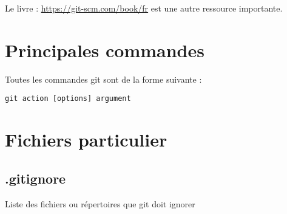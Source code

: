 \documentclass[a4paper]{article}
\begin{document}
Le livre : \url{https://git-scm.com/book/fr} est une autre ressource importante.

\section*{Principales commandes}

Toutes les commandes git sont de la forme suivante : 
\begin{verbatim}
git action [options] argument
\end{verbatim}
























\section*{Fichiers particulier}

\subsection*{.gitignore}
Liste des fichiers ou répertoires que git doit ignorer
\end{document}
